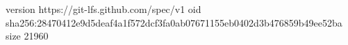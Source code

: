 version https://git-lfs.github.com/spec/v1
oid sha256:28470412e9d5deaf4a1f572dcf3fa0ab07671155eb0402d3b476859b49ee52ba
size 21960
